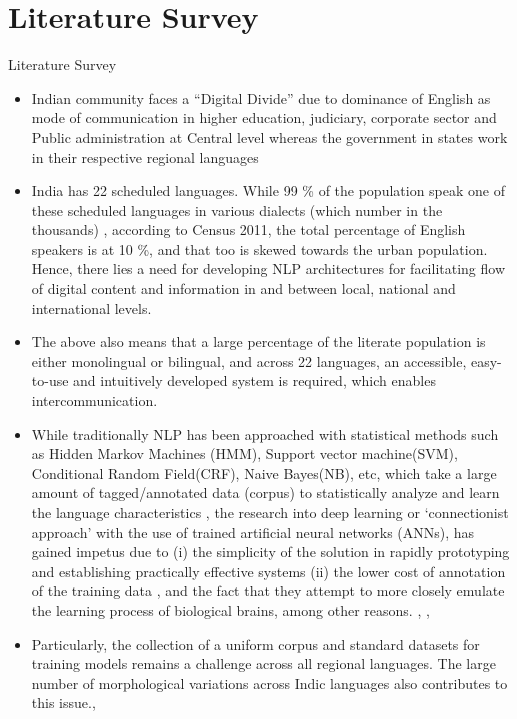 \documentclass{beamer}
\begin{document}
\section{Literature Survey}
	\begin{frame}[allowframebreaks]{Literature Survey}
	\begin{itemize}
		\item Indian community faces a “Digital Divide” due to dominance of English as mode of communication in higher education, judiciary, corporate sector and Public administration at Central level whereas the government in states work in their respective regional languages \cite{kurian2008natural} 
		\item India has 22 scheduled languages. While 99 \%  of the population speak one of these scheduled languages in various dialects (which number in the thousands) \cite{theindianexpress_2018}, according to Census 2011, the total percentage of English speakers is at 10 \%, and that too is skewed towards the urban population. \cite{s_2019} Hence, there lies a need for developing NLP architectures for facilitating flow of digital content and information in and between local, national and international levels.
		\item The above also means that a large percentage of the literate population is either monolingual or bilingual, and across 22 languages, an accessible, easy-to-use and intuitively developed system is required, which enables intercommunication.
		\item While traditionally NLP has been approached with statistical methods such as Hidden Markov Machines (HMM), Support vector machine(SVM), Conditional Random Field(CRF), Naive Bayes(NB), etc, which take a large amount of tagged/annotated data (corpus) to statistically analyze and learn the language characteristics \cite{desai2021taxonomic}, the research into deep learning or ‘connectionist approach’ \cite{desai2021taxonomic} with the use of trained artificial neural networks (ANNs), has gained impetus due to (i) the simplicity of the solution in rapidly prototyping and establishing practically effective systems (ii) the lower cost of annotation of the training data \cite{philip2019baseline}, and the fact that they attempt to more closely emulate the learning process of biological brains, among other reasons. \cite{desai2021taxonomic}, \cite{rosca2016sequence}, \cite{deselaers2009deep}
		\item Particularly, the collection of a uniform corpus and standard datasets for training models remains a challenge across all regional languages. The large number of morphological variations across Indic languages also contributes to this issue.\cite{kunchukuttan2020ai4bharat}, \cite{singhnlp}

\end{itemize}
\end{frame}
\end{document}

